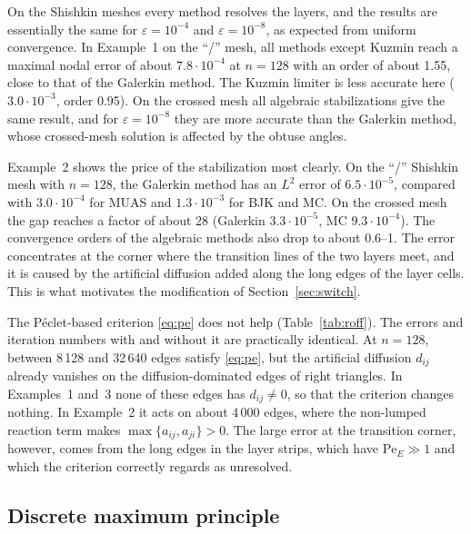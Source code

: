 \documentclass[11pt,a4paper]{article}
\newcommand{\eps}{\varepsilon}
\theoremstyle{remark}
\begin{document}
On the Shishkin meshes every method resolves the layers, and the results are essentially the same for
$\eps=10^{-4}$ and $\eps=10^{-8}$, as expected from uniform convergence. In Example~1 on the ``/'' mesh, all methods
except Kuzmin reach a maximal nodal error of about $7.8\cdot10^{-4}$ at $n=128$ with an order of about 1.55,
close to that of the Galerkin method. The Kuzmin limiter is less accurate here ($3.0\cdot10^{-3}$, order 0.95).
On the crossed mesh all algebraic stabilizations give the same result, and for $\eps=10^{-8}$ they are more accurate
than the Galerkin method, whose crossed-mesh solution is affected by the obtuse angles.

Example~2 shows the price of the stabilization most clearly. On the ``/'' Shishkin mesh with $n=128$, the Galerkin
method has an $L^2$ error of $6.5\cdot10^{-5}$, compared with $3.0\cdot10^{-4}$ for MUAS and $1.3\cdot10^{-3}$ for
BJK and MC. On the crossed mesh the gap reaches a factor of about 28 (Galerkin $3.3\cdot10^{-5}$, MC $9.3\cdot10^{-4}$).
The convergence orders of the algebraic methods also drop to about 0.6--1. The error concentrates at the corner where
the transition lines of the two layers meet, and it is caused by the artificial diffusion added along the long edges
of the layer cells. This is what motivates the modification of Section~\ref{sec:switch}.



The P\'eclet-based criterion \eqref{eq:pe} does not help (Table~\ref{tab:roff}). The errors and iteration numbers
with and without it are practically identical. At $n=128$, between 8\,128 and 32\,640 edges satisfy \eqref{eq:pe},
but the artificial diffusion $d_{ij}$ already vanishes on the diffusion-dominated edges of right triangles. In
Examples~1 and~3 none of these edges has $d_{ij}\neq0$, so that the criterion changes nothing. In Example~2 it acts on
about 4\,000 edges, where the non-lumped reaction term makes $\max\{a_{ij},a_{ji}\}>0$. The large error at the
transition corner, however, comes from the long edges in the layer strips, which have $\mathrm{Pe}_E\gg1$ and which
the criterion correctly regards as unresolved.

\subsection{Discrete maximum principle}


\end{document}
